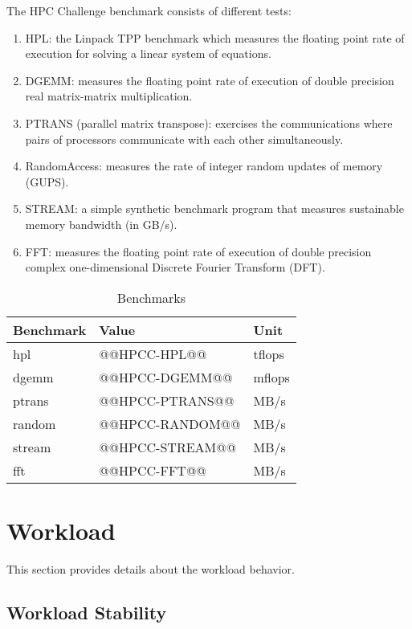 \documentclass[a4paper]{article}
\begin{document}
\smallskip

The HPC Challenge benchmark consists of different tests:

\begin{enumerate}
\item{HPL}: the Linpack TPP benchmark which measures the floating point rate of execution for solving a linear system of equations.
\item{DGEMM}: measures the floating point rate of execution of double precision real matrix-matrix multiplication.
\item{PTRANS (parallel matrix transpose)}: exercises the communications where pairs of processors communicate with each other simultaneously.
\item{RandomAccess}: measures the rate of integer random updates of memory (GUPS).
\item{STREAM}: a simple synthetic benchmark program that measures sustainable memory bandwidth (in GB/s).
\item{FFT}: measures the floating point rate of execution of double precision complex one-dimensional Discrete Fourier Transform (DFT).
\end{enumerate}

\begin{table}[H]
\caption{Benchmarks}
  \centering
    \begin{tabular}{|l|l|l|}\hline
      {\bf Benchmark} & {\bf Value} & {\bf Unit} \\ \hline
      hpl & @@HPCC-HPL@@ & tflops \\ \hline
      dgemm & @@HPCC-DGEMM@@ & mflops \\ \hline
      ptrans & @@HPCC-PTRANS@@ & MB/s \\ \hline
      random & @@HPCC-RANDOM@@ & MB/s \\ \hline
      stream & @@HPCC-STREAM@@ & MB/s \\ \hline
      fft & @@HPCC-FFT@@ & MB/s \\ \hline
    \end{tabular}
 \label{table:pruebas}
\end{table}

\section{Workload}

This section provides details about the workload behavior.

\subsection{Workload Stability}
\end{document}
